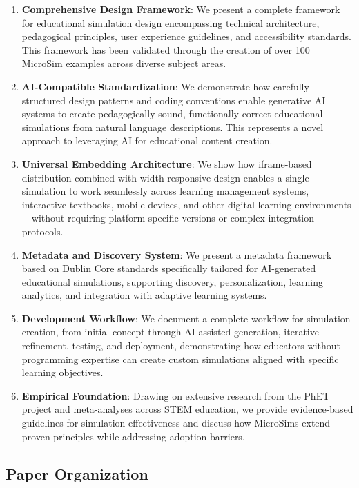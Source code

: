 \begin{enumerate}
\item \textbf{Comprehensive Design Framework}: We present a complete framework for educational simulation design encompassing technical architecture, pedagogical principles, user experience guidelines, and accessibility standards. This framework has been validated through the creation of over 100 MicroSim examples across diverse subject areas.

\item \textbf{AI-Compatible Standardization}: We demonstrate how carefully structured design patterns and coding conventions enable generative AI systems to create pedagogically sound, functionally correct educational simulations from natural language descriptions. This represents a novel approach to leveraging AI for educational content creation.

\item \textbf{Universal Embedding Architecture}: We show how iframe-based distribution combined with width-responsive design enables a single simulation to work seamlessly across learning management systems, interactive textbooks, mobile devices, and other digital learning environments---without requiring platform-specific versions or complex integration protocols.

\item \textbf{Metadata and Discovery System}: We present a metadata framework based on Dublin Core standards specifically tailored for AI-generated educational simulations, supporting discovery, personalization, learning analytics, and integration with adaptive learning systems.

\item \textbf{Development Workflow}: We document a complete workflow for simulation creation, from initial concept through AI-assisted generation, iterative refinement, testing, and deployment, demonstrating how educators without programming expertise can create custom simulations aligned with specific learning objectives.

\item \textbf{Empirical Foundation}: Drawing on extensive research from the PhET project and meta-analyses across STEM education, we provide evidence-based guidelines for simulation effectiveness and discuss how MicroSims extend proven principles while addressing adoption barriers.
\end{enumerate}

\subsection{Paper Organization}

